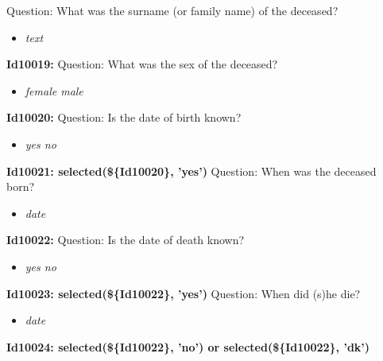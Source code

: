 \documentclass{article}%
\begin{document}
Question: What was the surname (or family name)\newline%
 of the deceased?\newline%
%
\begin{itemize}%
\item%
\textit{text\newline%
}%
\end{itemize}%
\textbf{Id10019: \newline%
}%
Question: What was the sex of the deceased?\newline%
%
\begin{itemize}%
\item%
\textit{female\newline%
 male\newline%
}%
\end{itemize}%
\textbf{Id10020: \newline%
}%
Question: Is the date of birth known?\newline%
%
\begin{itemize}%
\item%
\textit{yes\newline%
 no\newline%
}%
\end{itemize}%
\textbf{Id10021: selected(\$\{Id10020\}, 'yes')\newline%
}%
Question: When was the deceased born?\newline%
%
\begin{itemize}%
\item%
\textit{date\newline%
}%
\end{itemize}%
\textbf{Id10022: \newline%
}%
Question: Is the date of death known?\newline%
%
\begin{itemize}%
\item%
\textit{yes\newline%
 no\newline%
}%
\end{itemize}%
\textbf{Id10023: selected(\$\{Id10022\}, 'yes')\newline%
}%
Question: When did (s)he die?\newline%
%
\begin{itemize}%
\item%
\textit{date\newline%
}%
\end{itemize}%
\textbf{Id10024: selected(\$\{Id10022\}, 'no') or selected(\$\{Id10022\}, 'dk')\newline%
}%
\end{document}
